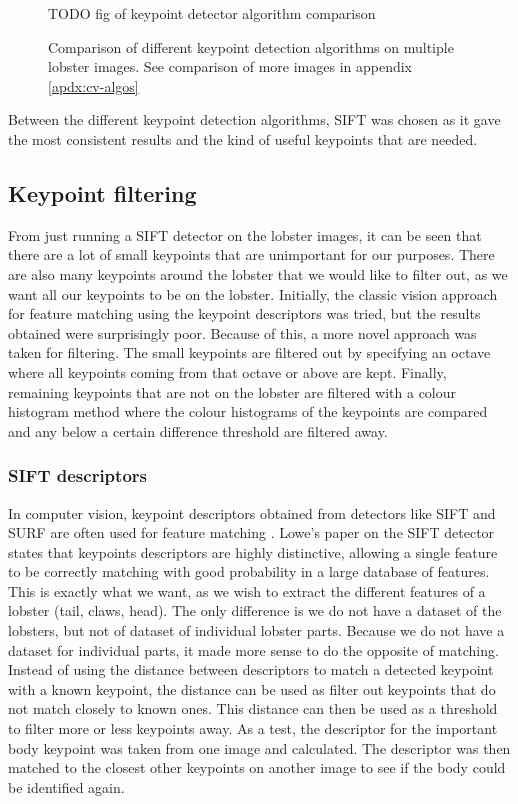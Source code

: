 \begin{figure}[H]
\centering
TODO  fig of keypoint detector algorithm comparison
\caption{Comparison of different keypoint detection algorithms on multiple lobster images. See comparison of more images in appendix \ref{apdx:cv-algos}}
\end{figure}
\noindent

Between the different keypoint detection algorithms, SIFT was chosen as it gave the most consistent results and the kind of useful keypoints that are needed.


\subsection{Keypoint filtering}\label{sec:kp-filter}
From just running a SIFT detector on the lobster images, it can be seen that there are a lot of small keypoints that are unimportant for our purposes. There are also many keypoints around the lobster that we would like to filter out, as we want all our keypoints to be on the lobster. Initially, the classic vision approach for feature matching using the keypoint descriptors \cite{sift} was tried, but the results obtained were surprisingly poor. Because of this, a more novel approach was taken for filtering. The small keypoints are filtered out by specifying an octave where all keypoints coming from that octave or above are kept. Finally, remaining keypoints that are not on the lobster are filtered with a colour histogram method where the colour histograms of the keypoints are compared and any below a certain difference threshold are filtered away.

\subsubsection{SIFT descriptors}
In computer vision, keypoint descriptors obtained from detectors like SIFT and SURF are often used for feature matching \cite{cv-matching}. Lowe's paper \cite{sift} on the SIFT detector states that keypoints descriptors are highly distinctive, allowing a single feature to be correctly matching with good probability in a large database of features. This is exactly what we want, as we wish to extract the different features of a lobster (tail, claws, head). The only difference is we do not have a dataset of the lobsters, but not of dataset of individual lobster parts. 
\n
Because we do not have a dataset for individual parts, it made more sense to do the opposite of matching. Instead of using the distance between descriptors to match a detected keypoint with a known keypoint, the distance can be used as filter out keypoints that do not match closely to known ones. This distance can then be used as a threshold to filter more or less keypoints away. 
\n
As a test, the descriptor for the important body keypoint was taken from one image and calculated. The descriptor was then matched to the closest other keypoints on another image to see if the body could be identified again. 

